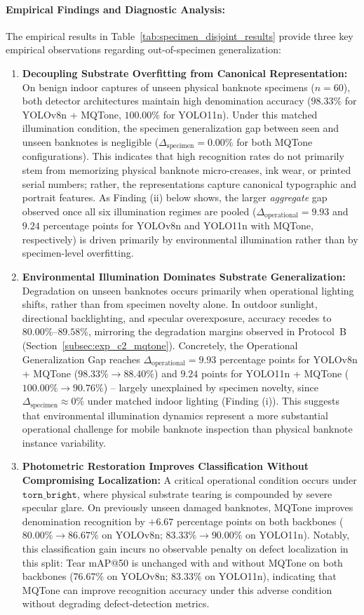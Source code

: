 \documentclass[final,5p,times,twocolumn,authoryear]{elsarticle}
\begin{document}
\paragraph{Empirical Findings and Diagnostic Analysis:}
The empirical results in Table~\ref{tab:specimen_disjoint_results} provide three key empirical observations regarding out-of-specimen generalization:
\begin{enumerate}[label=(\roman*)]
    \item \textbf{Decoupling Substrate Overfitting from Canonical Representation:} On benign indoor captures of unseen physical banknote specimens ($n = 60$), both detector architectures maintain high denomination accuracy ($98.33\%$ for YOLOv8n + MQTone, $100.00\%$ for YOLO11n). Under this matched illumination condition, the specimen generalization gap between seen and unseen banknotes is negligible ($\Delta_{\text{specimen}} = 0.00\%$ for both MQTone configurations). This indicates that high recognition rates do not primarily stem from memorizing physical banknote micro-creases, ink wear, or printed serial numbers; rather, the representations capture canonical typographic and portrait features. As Finding (ii) below shows, the larger \emph{aggregate} gap observed once all six illumination regimes are pooled ($\Delta_{\text{operational}} = 9.93$ and $9.24$ percentage points for YOLOv8n and YOLO11n with MQTone, respectively) is driven primarily by environmental illumination rather than by specimen-level overfitting.
    \item \textbf{Environmental Illumination Dominates Substrate Generalization:} Degradation on unseen banknotes occurs primarily when operational lighting shifts, rather than from specimen novelty alone. In outdoor sunlight, directional backlighting, and specular overexposure, accuracy recedes to $80.00\%$--$89.58\%$, mirroring the degradation margins observed in Protocol~B (Section~\ref{subsec:exp_c2_mqtone}). Concretely, the Operational Generalization Gap reaches $\Delta_{\text{operational}} = 9.93$ percentage points for YOLOv8n + MQTone ($98.33\% \to 88.40\%$) and $9.24$ points for YOLO11n + MQTone ($100.00\% \to 90.76\%$) -- largely unexplained by specimen novelty, since $\Delta_{\text{specimen}} \approx 0\%$ under matched indoor lighting (Finding (i)). This suggests that environmental illumination dynamics represent a more substantial operational challenge for mobile banknote inspection than physical banknote instance variability.
    \item \textbf{Photometric Restoration Improves Classification Without Compromising Localization:} A critical operational condition occurs under $\texttt{torn\_bright}$, where physical substrate tearing is compounded by severe specular glare. On previously unseen damaged banknotes, MQTone improves denomination recognition by $+6.67$ percentage points on both backbones ($80.00\% \to 86.67\%$ on YOLOv8n; $83.33\% \to 90.00\%$ on YOLO11n). Notably, this classification gain incurs no observable penalty on defect localization in this split: Tear mAP@50 is unchanged with and without MQTone on both backbones ($76.67\%$ on YOLOv8n; $83.33\%$ on YOLO11n), indicating that MQTone can improve recognition accuracy under this adverse condition without degrading defect-detection metrics.
\end{enumerate}
\end{document}
